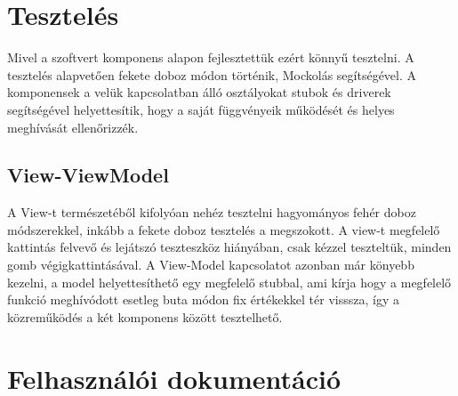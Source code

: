 \documentclass[a4paper,12pt]{report}
\begin{document}
\chapter{Tesztelés}

Mivel a szoftvert komponens alapon fejlesztettük ezért könnyű tesztelni. A tesztelés alapvetően fekete doboz módon történik, Mockolás segítségével. A komponensek a velük kapcsolatban álló osztályokat stubok és driverek segítségével helyettesítik, hogy a saját függvényeik működését és helyes meghívását ellenőrizzék.

\section{View-ViewModel}

A View-t természetéből kifolyóan nehéz tesztelni hagyományos fehér doboz módszerekkel, inkább a fekete doboz tesztelés a megszokott. A view-t megfelelő kattintás felvevő és lejátszó teszteszköz hiányában, csak kézzel teszteltük, minden gomb végigkattintásával. A View-Model kapcsolatot azonban már könyebb kezelni, a model helyettesíthető egy megfelelő stubbal, ami kírja hogy a megfelelő funkció meghívódott esetleg buta módon fix értékekkel tér visssza, így a közreműködés a két komponens között tesztelhető.

\chapter{Felhasználói dokumentáció}
\end{document}
